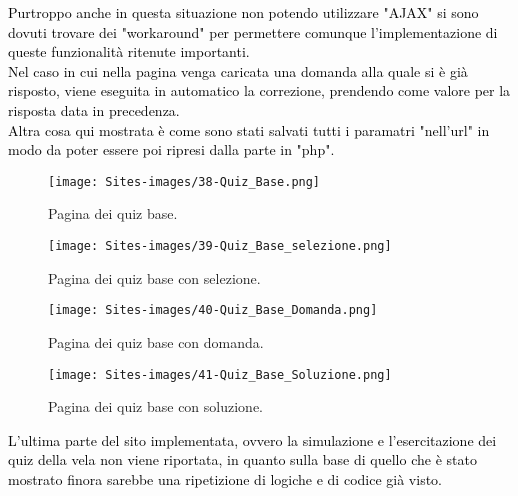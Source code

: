 \begin{minipage}{\textwidth}
	\vspace*{-11cm}
	\textcolor{black}{Purtroppo anche in questa situazione non potendo utilizzare "AJAX" si sono dovuti trovare dei "workaround" per permettere comunque l'implementazione di queste funzionalità ritenute importanti.\\
	Nel caso in cui nella pagina venga caricata una domanda alla quale si è già risposto, viene eseguita in automatico la correzione, prendendo come valore per la risposta data in precedenza.\\
	Altra cosa qui mostrata è come sono stati salvati tutti i paramatri "nell'url" in modo da poter essere poi ripresi dalla parte in "php".}\\
\end{minipage}

\begin{minipage}{\textwidth}
\begin{figure}[H]
	\begin{center}
		\texttt{[image: Sites-images/38-Quiz\_Base.png]}
		\caption{Pagina dei quiz base.}
	\end{center}
\end{figure}

\begin{figure}[H]
	\begin{center}
		\texttt{[image: Sites-images/39-Quiz\_Base\_selezione.png]}
		\caption{Pagina dei quiz base con selezione.}
	\end{center}
\end{figure}

\begin{figure}[H]
	\begin{center}
		\texttt{[image: Sites-images/40-Quiz\_Base\_Domanda.png]}
		\caption{Pagina dei quiz base con domanda.}
	\end{center}
\end{figure}

\end{minipage}

\begin{minipage}{\textwidth}

\begin{figure}[H]
	\begin{center}
		\texttt{[image: Sites-images/41-Quiz\_Base\_Soluzione.png]}
		\caption{Pagina dei quiz base con soluzione.}
	\end{center}
\end{figure}
\end{minipage}

\raggedright
\textcolor{black}{L'ultima parte del sito implementata, ovvero la simulazione e l'esercitazione dei quiz della vela non viene riportata, in quanto sulla base di quello che è stato mostrato finora sarebbe una ripetizione di logiche e di codice già visto.} 